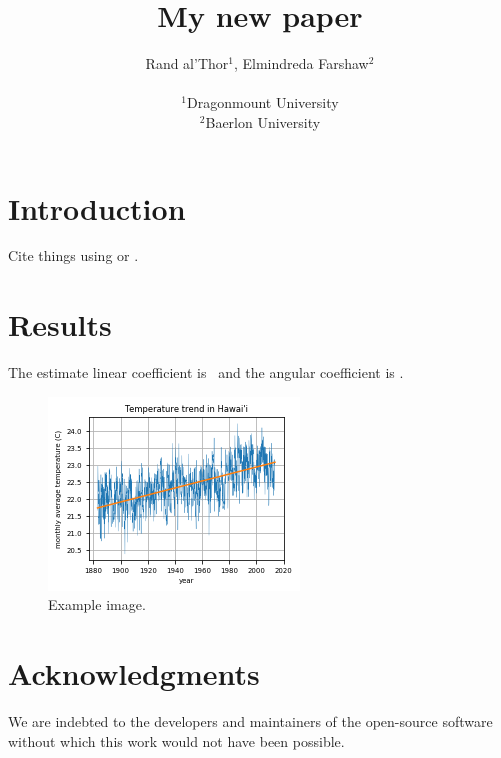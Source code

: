 \documentclass[twocolumn]{article}
\begin{document}
\title{
    My new paper
}
\author{
    Rand al'Thor$^{1}$,
    Elmindreda Farshaw$^{2}$
    \\\\
    {\small
        $^1$Dragonmount University
    }
    \\
    {\small
        $^2$Baerlon University
    }
}


\maketitle


\begin{abstract}
    \lipsum[1]
\end{abstract}


\section{Introduction}

Cite things using \citet{tikhonov1977} or \citep{tikhonov1977}.


\section{Results}

The estimate linear coefficient is \HawaiiLinearCoef\ and the angular
coefficient is \HawaiiAngularCoef.

\begin{figure}
    \centering
    \includegraphics[]{figures/hawaii-trend}
    \caption{
        Example image.
    }
    \label{fig:meh}
\end{figure}


\section{Acknowledgments}

We are indebted to the developers and maintainers of the open-source
software without which this work would not have been possible.




\end{document}
